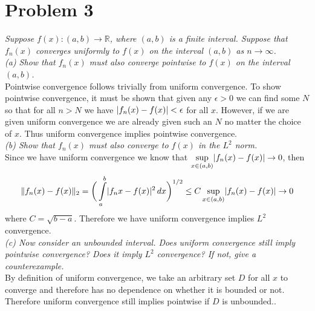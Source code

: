 \documentclass[12pt]{article}
\DeclarePairedDelimiter \abs{\lvert}{\rvert}%
\DeclarePairedDelimiter \norm{\lVert}{\rVert}%
\theoremstyle{remark}
\begin{document}
\newpage

\section*{Problem 3}
\textit{Suppose $f(x): (a,b) \rightarrow \mathbb{R}$, where $(a,b)$ is a finite interval. Suppose that $f_n(x)$ converges uniformly to $f(x)$ on the interval $(a,b)$ as $n \rightarrow \infty$.} \\

\textit{(a) Show that $f_n(x)$ must also converge pointwise to $f(x)$ on the interval $(a,b)$.} \\ 

Pointwise convergence follows trivially from uniform convergence. To show pointwise convergence, it must be shown that given any $\epsilon > 0$ we can find some $N$ so that for all $n > N$ we have $\abs{f_n(x) - f(x)} < \epsilon$ for all $x$. However, if we are given uniform convergence we are already given such an $N$ no matter the choice of $x$. Thus uniform convergence implies pointwise convergence. \\

\textit{(b) Show that $f_n(x)$ must also converge to $f(x)$ in the $L^2$ norm.} \\ 

Since we have uniform convergence we know that $\sup\limits_{x\in(a,b)}\abs{f_n(x) - f(x)} \rightarrow 0$, then
\begin{align*}
	\norm{f_n(x) - f(x)}_2 = \bigg(\int\limits_a^b \abs{f_n{x} - f(x)}^2 \, dx\bigg)^{1/2} \leq C\sup\limits_{x\in(a,b)}\abs{f_n(x) - f(x)} \rightarrow 0
\end{align*}
where $C = \sqrt{b-a}$. Therefore we have uniform convergence implies $L^2$ convergence. \\

\textit{(c) Now consider an unbounded interval. Does uniform convergence still imply pointwise convergence? Does it imply $L^2$ convergence? If not, give a counterexample.} \\

By definition of uniform convergence, we take an arbitrary set $D$ for all $x$ to converge and therefore has no dependence on whether it is bounded or not. Therefore uniform convergence still implies pointwise if $D$ is unbounded..  
 
\end{document}
